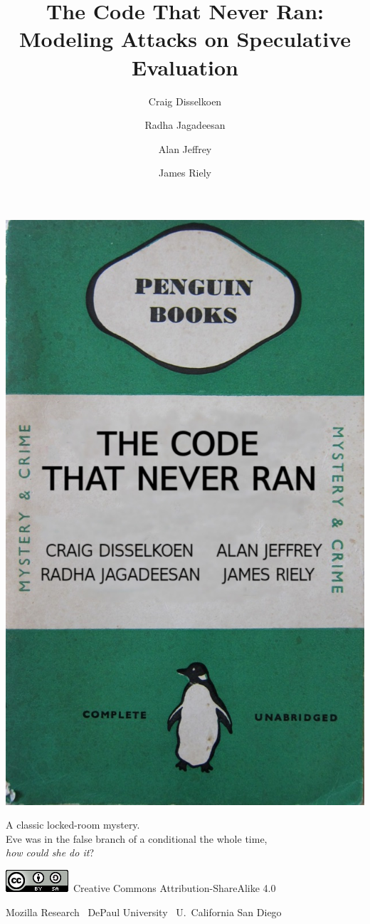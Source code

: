 \documentclass{beamer}
\title{The Code That Never Ran: Modeling Attacks on Speculative Evaluation}
\author{Craig Disselkoen \and Radha Jagadeesan \and Alan Jeffrey \and James Riely}
\begin{document}
\begin{frame}[plain]
  \includegraphics[height=.9\textheight]{green-penguin.jpg}
  \begin{minipage}[b][.9\textheight]{.66\textwidth}\raggedleft
    A classic locked-room mystery.\\
    Eve was in the false branch of a conditional the whole time,\\
    \emph{how could she do it}?

    \vss

    \tiny
    \includegraphics[height=1.5ex]{cc-by-88x31.png}~Creative Commons Attribution-ShareAlike 4.0

    Mozilla Research \textbar~DePaul University \textbar~U.~California San Diego
  \end{minipage}
\end{frame}
\end{document}
